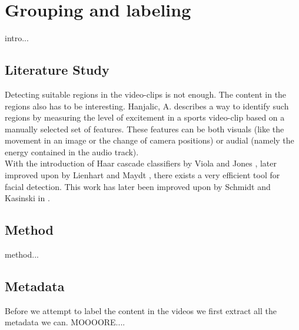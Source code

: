 %
\section{Grouping and labeling}
%
intro...
%
\subsection{Literature Study}
%
Detecting suitable regions in the video-clips is not enough. The content in the regions also has to be interesting. Hanjalic, A. \cite{citeulike:405480} describes a way to identify such regions by measuring the level of excitement in a sports video-clip based on a manually selected set of features. These features can be both visuals (like the movement in an image or the change of camera positions) or audial (namely the energy contained in the audio track).%
\\
%
With the introduction of Haar cascade classifiers by Viola and Jones \cite{viola01}, later improved upon by Lienhart and Maydt \cite{lienhart01}, there exists a very efficient tool for facial detection. This work has later been improved upon by Schmidt and Kasinski in \cite{schmidt01}\cite{schmidt02}.
%
\subsection{Method}
%
method...
%
\subsection{Metadata}
%
Before we attempt to label the content in the videos we first extract all the metadata we can. MOOOORE....
%
